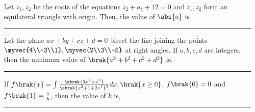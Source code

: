 	\item Let $z_1,z_2$ be the roots of the equations $z_2+a_z+12=0$ and $z_1,z_2$ form an equilateral triangle with origin. Then, the value of $\abs{a}$ is \rule{2cm}{0.1pt}	\hfill {} 
	\item Let the plane $ax+by+cz+d=0$ bisect the line joining the points $\myvec{4\\-3\\1},\myvec{2\\3\\-5}$ at right angles. If $a,b,c,d$ are integers, then the minimum value of $\brak{a^2+b^2+c^2+d^2}$ is,\rule{2cm}{0.1pt}	\hfill {} 
	\item If $f\brak{x}=\int\frac{\sbrak{5x^8+x^6}}{\sbrak{x^2+1+2x^7}^2}dx, \brak{x\ge0}$, $f\brak{0}=0$ and $f\brak{1}=\frac{1}{k}$, then the value of $k$ is, \rule{2cm}{0.1pt}	\hfill {} 
